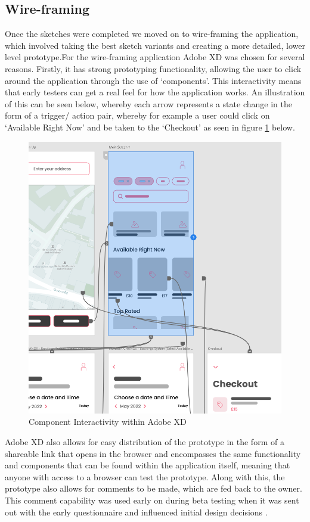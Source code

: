 \documentclass[12pt]{article}
\begin{document}
	\subsection{Wire-framing}
	Once the sketches were completed we moved on to wire-framing the application, which involved taking the best sketch variants and creating a more detailed, lower level prototype.For the wire-framing application Adobe XD was chosen for several reasons. Firstly, it has strong prototyping functionality, allowing the user to click around the application through the use of ‘components’. This interactivity means that early testers can get a real feel for how the application works. An illustration of this can be seen below, whereby each arrow represents a state change in the form of a trigger/ action pair, whereby for example a user could click on ‘Available Right Now’ and be taken to the ‘Checkout’ as seen in figure \ref{fig:prot-comp} below.
	\begin{figure}[H]
		\centering
		\includegraphics[scale=0.5]{images/prototyping-components.png}
		\caption{Component Interactivity within Adobe XD}
		\label{fig:prot-comp}
	\end{figure}
	
	
	Adobe XD also allows for easy distribution of the prototype in the form of a shareable link that opens in the browser and encompasses the same functionality and components that can be found within the application itself, meaning that anyone with access to a browser can test the prototype. Along with this, the prototype also allows for comments to be made, which are fed back to the owner. This comment capability was used early on during beta testing when it was sent out with the early questionnaire and influenced initial design decisions \cite{SketchVsFigma0200}.
	
\end{document}
